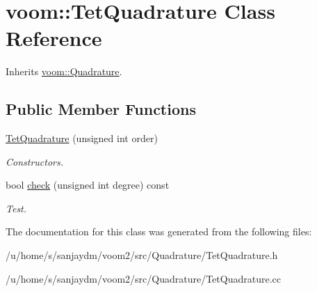 \hypertarget{classvoom_1_1_tet_quadrature}{
\section{voom::TetQuadrature Class Reference}
\label{classvoom_1_1_tet_quadrature}
}


Inherits \hyperlink{classvoom_1_1_quadrature}{voom::Quadrature}.\subsection*{Public Member Functions}
\begin{DoxyCompactItemize}
\item 
\hypertarget{classvoom_1_1_tet_quadrature_afb15d49b3ab9b74e3e2cfb578df01edd}{
\hyperlink{classvoom_1_1_tet_quadrature_afb15d49b3ab9b74e3e2cfb578df01edd}{TetQuadrature} (unsigned int order)}
\label{classvoom_1_1_tet_quadrature_afb15d49b3ab9b74e3e2cfb578df01edd}

\begin{DoxyCompactList}\small\item\em Constructors. \item\end{DoxyCompactList}\item 
\hypertarget{classvoom_1_1_tet_quadrature_ace08644853d3635368344c9eeda1072f}{
bool \hyperlink{classvoom_1_1_tet_quadrature_ace08644853d3635368344c9eeda1072f}{check} (unsigned int degree) const }
\label{classvoom_1_1_tet_quadrature_ace08644853d3635368344c9eeda1072f}

\begin{DoxyCompactList}\small\item\em Test. \item\end{DoxyCompactList}\end{DoxyCompactItemize}


The documentation for this class was generated from the following files:\begin{DoxyCompactItemize}
\item 
/u/home/s/sanjaydm/voom2/src/Quadrature/TetQuadrature.h\item 
/u/home/s/sanjaydm/voom2/src/Quadrature/TetQuadrature.cc\end{DoxyCompactItemize}
